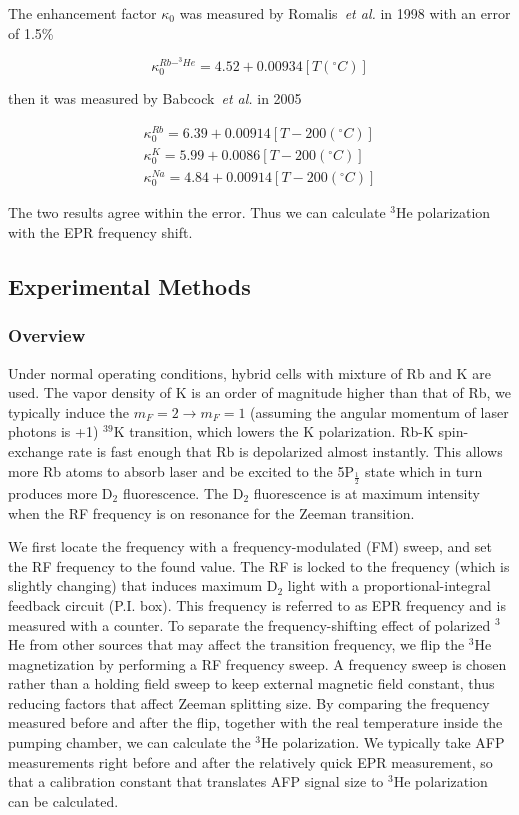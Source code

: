 The enhancement factor $\kappa_{0}$ was measured by Romalis~\emph{et al.} in 1998 with an error of 1.5\%~\cite{PhysRevA.58.3004}

\begin{equation}
\kappa_{0}^{Rb-^{3}He}=4.52+0.00934[T(^{\circ}C)]
\end{equation}

then it was measured by Babcock~\emph{et al.} in 2005

\begin{subequations}
	\begin{gather}
	\kappa_{0}^{Rb}=6.39+0.00914[T-200(^{\circ}C)]\\
	\kappa_{0}^{K}=5.99+0.0086[T-200(^{\circ}C)]\\
	\kappa_{0}^{Na}=4.84+0.00914[T-200(^{\circ}C)]
	\end{gather}
\end{subequations}

The two results agree within the error. Thus we can calculate $^{3}$He polarization with the EPR frequency shift. 

\subsection{Experimental Methods}

\subsubsection{Overview}

Under normal operating conditions, hybrid cells with mixture of Rb and K are used. The vapor density of K is an order of magnitude higher than that of Rb, we typically induce the $m_{F} = 2 \rightarrow m_{F} = 1$ (assuming the angular momentum of laser photons is +1) $^{39}$K transition, which lowers the K polarization. Rb-K spin-exchange rate is fast enough that Rb is depolarized almost instantly. This allows more Rb atoms to absorb laser and be excited to the 5P$_{\frac{1}{2}}$ state which in turn produces more D$_{2}$ fluorescence. The D$_{2}$ fluorescence is at maximum intensity when the RF frequency is on resonance for the Zeeman transition. 

We first locate the frequency with a frequency-modulated (FM) sweep, and set the RF frequency to the found value. The RF is locked to the frequency (which is slightly changing) that induces maximum D$_{2}$ light with a proportional-integral feedback circuit (P.I. box). This frequency is referred to as EPR frequency and is measured with a counter. To separate the frequency-shifting effect of polarized $^{3}$He from other sources that may affect the transition frequency, we flip the $^{3}$He magnetization by performing a RF frequency sweep. A frequency sweep is chosen rather than a holding field sweep  to keep external magnetic field constant, thus reducing factors that affect Zeeman splitting size. By comparing the frequency measured before and after the flip, together with the real temperature inside the pumping chamber, we can calculate the $^{3}$He polarization. We typically take AFP measurements right before and after the relatively quick EPR measurement, so that a calibration constant that translates AFP signal size to $^{3}$He polarization can be calculated.

